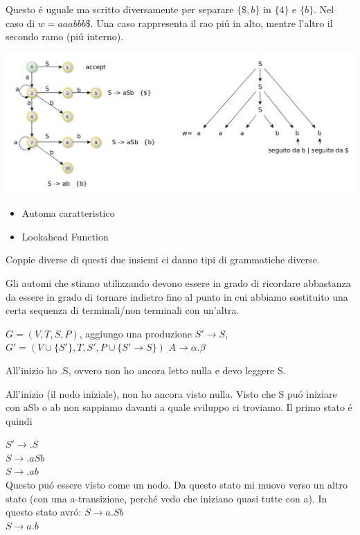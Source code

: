 Questo \'e uguale ma scritto diversamente per separare $\{ \$, b\}$ in $\{4\}$ e $\{b\}$. Nel caso di $w=aaabbb\$$. Una caso rappresenta
il rao pi\'u in alto, mentre l'altro il secondo ramo (pi\'u interno).

\begin{center}
    \includegraphics[scale=0.4]{Chapters/Img/c02_16.png}\\
\end{center} 

\begin{itemize}
    \item Automa caratteristico \\
    \item Lookahead Function \\
\end{itemize}

Coppie diverse di questi due insiemi ci danno tipi di grammatiche diverse.

Gli automi che stiamo utilizzando devono essere in grado di ricordare abbastanza da essere in grado di tornare indietro fino al punto 
in cui abbiamo sostituito una certa sequenza di terminali/non terminali con un'altra.

$G = (V,T,S,P)$, aggiungo una produzione $S' \rightarrow S$, $G' = (V \cup \{S'\},T,S',P \cup \{S' \rightarrow S\})$
$A \rightarrow \alpha . \beta $ 

All'inizio ho .S, ovvero non ho ancora letto nulla e devo leggere S.

All'inizio (il nodo iniziale), non ho ancora visto nulla. Visto che S pu\'o iniziare con aSb o ab non sappiamo davanti a quale sviluppo ci troviamo. Il primo stato \'e quindi 

$S' \rightarrow .S$\\
$S \rightarrow .aSb$\\
$S \rightarrow .ab$\\

Questo pu\'o essere visto come un nodo. Da questo stato mi muovo verso un altro stato (con una a-transizione, perch\'e vedo che iniziano 
quasi tutte con a). In questo stato avr\'o:
$S \rightarrow a.Sb$\\
$S \rightarrow a.b$\\

